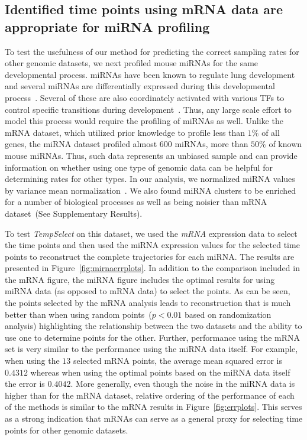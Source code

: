 \documentclass[10pt]{article}
\newcommand{\Tempselect}{\textit{TempSelect}\xspace}
\begin{document}
\subsection{Identified time points using mRNA data are appropriate for miRNA profiling}\label{sec:mirnaexp}

To test the usefulness of our method for predicting the correct sampling rates for other genomic datasets, we next profiled mouse
miRNAs for the same developmental process. miRNAs have been known to regulate lung development~\cite{sessa2013} and several miRNAs are differentially expressed
during this developmental process~\cite{williams2007}. Several of
these are also coordinately activated with various TFs to control
specific transitions during development~\cite{schulz2013}. Thus, any
large scale effort to model this process would require the profiling
of miRNAs as well. Unlike the mRNA dataset, which utilized prior knowledge to profile less than $1\%$ of
all genes, the miRNA dataset profiled almost $600$ miRNAs, more than $50\%$ of
known mouse miRNAs. Thus, such data represents an
unbiased sample and can provide information on whether using one
type of genomic data can be helpful for determining rates for other
types. In our analysis, we normalized miRNA values by variance mean
normalization~\cite{bolstad2003}. We also found miRNA clusters to be
enriched for a number of biological processes as well as being noisier than mRNA dataset~(See Supplementary Results).

To test \Tempselect on this dataset, we used the {\em mRNA} expression data to select the time points and then used the miRNA expression values for the selected time points to reconstruct the complete trajectories for each miRNA. The results are presented in Figure~\ref{fig:mirnaerrplots}. In
addition to the comparison included in the mRNA figure, the miRNA
figure includes the optimal results for using miRNA data (as opposed
to mRNA data) to select the points. As can be seen, the points selected by the mRNA analysis leads to
reconstruction that is much better than when using random points~($p <
0.01$ based on randomization analysis) highlighting the relationship between the two datasets and the
ability to use one to determine points for the other. Further,
performance using the mRNA set is very similar to the performance
using the miRNA data itself. For example, when using the $13$
selected mRNA points, the average mean squared error is $0.4312$ whereas when
using the optimal points based on the miRNA data itself the error
 is $0.4042$. More generally, even though the noise in the miRNA data is
higher than for the mRNA dataset, relative ordering of the performance of each of the methods is
similar to the mRNA results in Figure~\ref{fig:errplots}. This serves as a strong indication that mRNAs can serve as a general proxy for selecting time points for other genomic datasets.
\end{document}
